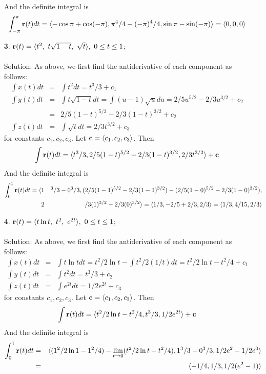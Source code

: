 \documentclass[12pt]{amsbook}
\newcommand{\la}{\langle}
\newcommand{\ra}{\rangle}
\begin{document}
\begin{enumerate}
  And the definite integral is
  $$\int_{-\pi}^\pi {\bf r}(t)dt=\la -\cos \pi+\cos(-\pi), \pi^4/4-(-\pi)^4/4, \sin \pi-\sin (-\pi) \ra = \la 0,0,0 \ra$$
  \item[{\small\bf 3}.] ${\bf r}(t)=\la t^2,\ t\sqrt{1-t},\ \sqrt{t}\ra, \ 0 \leq t \leq 1$;
  \\
  \\
  {\sc Solution}: As above, we first find the antiderivative of each component as follows:
  \begin{eqnarray*}
  \int x(t)dt&=&\int t^2 dt = t^3/3+c_1 \\
  \int y(t)dt&=&\int t\sqrt{1-t} dt = \int (u-1)\sqrt{u}du= 2/5u^{5/2}-2/3u^{3/2}+c_2\\
  &=&2/5(1-t)^{5/2}-2/3(1-t)^{3/2} +c_2 \\
  \int z(t)dt&=&\int \sqrt{t} dt = 2/3t^{3/2}+c_3 
  \end{eqnarray*}
  for constants $c_1,c_2,c_3$. Let ${\bf c}=\la c_1,c_2,c_3\ra$. Then 
  $$\int {\bf r}(t)dt=\la t^3/3,2/5(1-t)^{5/2}-2/3(1-t)^{3/2},2/3t^{3/2} \ra + {\bf c}$$
  And the definite integral is
\begin{eqnarray*}
\int_0^1 {\bf r}(t)dt=\la &1&^3/3-0^3/3,(2/5(1-1)^{5/2}-2/3(1-1)^{3/2})-(2/5(1-0)^{5/2}-2/3(1-0)^{3/2}),\\
&2&/3(1)^{3/2}-2/3(0)^{3/2} \ra=\la 1/3,-2/5+2/3,2/3 \ra=\la 1/3,4/15,2/3\ra
\end{eqnarray*}  
  \item[{\small\bf 4}.] ${\bf r}(t)=\la t\ln t,\ t^2,\ e^{2t} \ra, \ 0 \leq t \leq 1$;
  \\
  \\
  {\sc Solution}: As above, we first find the antiderivative of each component as follows:
  \begin{eqnarray*}
  \int x(t)dt&=&\int t\ln t dt = t^2/2\ln t - \int t^2/2(1/t)dt = t^2/2\ln t - t^2/4 +c_1 \\
  \int y(t)dt&=&\int t^2 dt = t^3/3+c_2\\
  \int z(t)dt&=&\int e^{2t} dt = 1/2e^{2t}+c_3 
  \end{eqnarray*}
  for constants $c_1,c_2,c_3$. Let ${\bf c}=\la c_1,c_2,c_3\ra$. Then 
  $$\int {\bf r}(t)dt=\la t^2/2\ln t - t^2/4, t^3/3,   1/2e^{2t}\ra + {\bf c}$$
  And the definite integral is
\begin{eqnarray*}
\int_0^1 {\bf r}(t)dt&=&\la (1^2/2\ln 1 - 1^2/4)-\lim_{t \rightarrow 0}(t^2/2\ln t - t^2/4), 1^3/3-0^3/3, 1/2e^{2}-1/2e^{0} \ra\\
& =& \la -1/4,1/3,1/2(e^2-1)\ra
\end{eqnarray*}

\end{enumerate}
\end{document}
